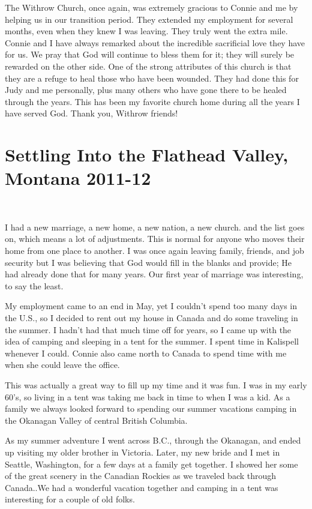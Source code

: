 \documentclass[twoside, 12pt]{book}
\begin{document}
The Withrow Church, once again, was extremely gracious to Connie and me by helping us in our transition period. They extended my employment for several months, even when they knew I was leaving. They truly went the extra mile. Connie and I have always remarked about the incredible sacrificial love they have for us. We pray that God will continue to bless them for it; they will surely be rewarded on the other side. One of the strong attributes of this church is that they are a refuge to heal those who have been wounded. They had done this for Judy and me personally, plus many others who have gone there to be healed through the years. This has been my favorite church home during all the years I have served God. Thank you, Withrow friends!



\section{Settling Into the Flathead Valley, Montana 2011-12}
\

I had a new marriage, a new home, a new nation, a new church. and the list goes on, which means a lot of adjustments. This is normal for anyone who moves their home from one place to another. I was once again leaving family, friends, and job security but I was  believing that God would fill in the blanks and provide; He had already done that for many years. Our first year of marriage was interesting, to say the least.

My employment came to an end in May, yet I couldn’t spend too many days in the U.S., so I decided to rent out my house in Canada and do some traveling in the summer. I hadn’t had that much time off for years, so I came up with the idea of camping and sleeping in a tent for the summer. I spent time in Kalispell whenever I could. Connie also came north to Canada to spend time with me when she could leave the office.

This was actually a great way to fill up my time and it was fun. I was in my early 60’s, so living in a tent was taking me back in time to when I was a kid. As a family we always looked forward to spending our summer vacations camping in the Okanagan Valley of central British Columbia.

As my summer adventure I went across B.C., through the Okanagan, and ended up visiting my older brother in Victoria. Later, my new bride and I met in Seattle, Washington, for a few days at a family get together. I showed her some of the great scenery in the Canadian Rockies as we traveled back through Canada..We had a wonderful vacation together and camping in a tent was interesting for a couple of old folks.
\end{document}
